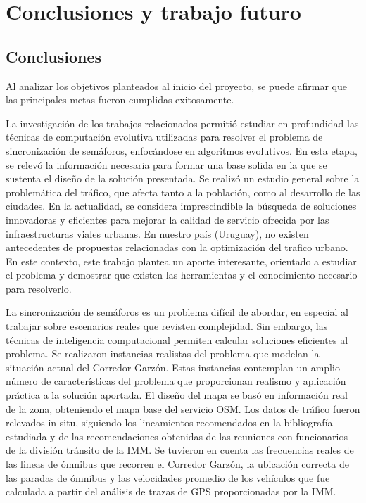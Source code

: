 \chapter{Conclusiones y trabajo futuro}

\section{Conclusiones}
Al analizar los objetivos planteados al inicio del proyecto, se puede afirmar que las principales metas fueron cumplidas exitosamente.

La investigación de los trabajos relacionados permitió estudiar en profundidad las técnicas de computación evolutiva utilizadas para resolver el problema de sincronización de semáforos, enfocándose en algoritmos evolutivos. En esta etapa, se relevó la información necesaria para formar una base solida en la que se sustenta el diseño de la solución presentada. Se realizó un estudio general sobre la problemática del tráfico, que afecta tanto a la población, como al desarrollo de las ciudades. En la actualidad, se considera imprescindible la búsqueda de soluciones innovadoras y eficientes para mejorar la calidad de servicio ofrecida por las infraestructuras viales urbanas. En nuestro país (Uruguay), no existen antecedentes de propuestas relacionadas con la optimización del trafico urbano. En este contexto, este trabajo plantea un aporte interesante, orientado a estudiar el problema y demostrar que existen las herramientas y el conocimiento necesario para resolverlo.

La sincronización de semáforos es un problema difícil de abordar, en especial al trabajar sobre escenarios reales que revisten complejidad. Sin embargo, las técnicas de inteligencia computacional permiten calcular soluciones eficientes al problema. Se realizaron instancias realistas del problema que modelan la situación actual del Corredor Garzón. Estas instancias contemplan un amplio número de características del problema que proporcionan realismo y aplicación práctica a la solución aportada. El diseño del mapa se basó en información real de la zona, obteniendo el mapa base del servicio OSM. Los datos de tráfico fueron relevados in-situ, siguiendo los lineamientos recomendados en la bibliografía estudiada y de las recomendaciones obtenidas de las reuniones con funcionarios de la división tránsito de la IMM. Se tuvieron en cuenta las frecuencias reales de las lineas de ómnibus que recorren el Corredor Garzón,  la ubicación correcta de las paradas de ómnibus y las velocidades promedio de los vehículos que fue calculada a partir del análisis de trazas de GPS proporcionadas por la IMM.
 
